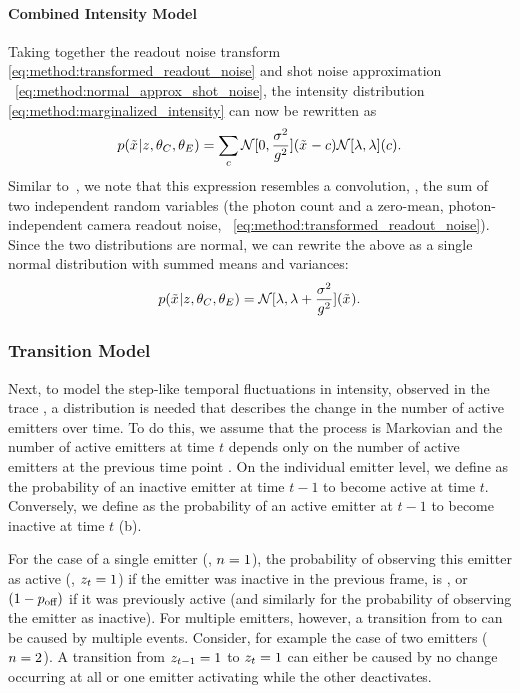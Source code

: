 \paragraph{Combined Intensity Model}

Taking together the readout noise transform
\eqref{eq:method:transformed_readout_noise} and shot noise approximation ~\eqref{eq:method:normal_approx_shot_noise}, the
intensity distribution \eqref{eq:method:marginalized_intensity} can now be
rewritten as
%
  \begin{equation}
    p(\tilde{x}_{}|z_{},\theta_C, \theta_E)
      = \sum_c
        \mathcal{N}[0, \frac{\sigma^2}{g^2}](\tilde{x}_{} - c)
        \mathcal{N}[\lambda, \lambda](c)
    \text{.}
  \end{equation}
  Similar to~\cite{huang_video-rate_2013}, we note that this expression
  resembles a convolution, \ie, the sum of two independent random variables
  (the photon count \photons and a zero-mean, photon-independent camera readout
  noise, ~\eqref{eq:method:transformed_readout_noise}). Since the two distributions are normal, we can rewrite
  the above as a single normal distribution with summed means and variances:
  \begin{equation}
    p(\tilde{x}_{}|z_{},\theta_C, \theta_E)
      = \mathcal{N}[\lambda, \lambda + \frac{\sigma^2}{g^2}](\tilde{x}_{})
    \text{.}
    \label{eq:method:combined_intensity}
  \end{equation}

\subsubsection{Transition Model}

Next, to model the step-like temporal fluctuations in intensity, observed in
the trace \trace, a distribution is needed that describes the change in the
number of active emitters \z{} over time.
  To do this, we assume that the process is Markovian and the number of active
  emitters  at time $t$ depends only on the number of active emitters at
  the previous time point .
  On the individual emitter level, we define \pon as the probability of an
  inactive emitter at time $t-1$ to become active at time $t$.
  Conversely, we define \poff as the probability of an active emitter at $t-1$
  to become inactive at time $t$ (b).

For the case of a single emitter (\ie, $n=1$), the probability of observing
this emitter as active (\ie, $z_{t}=1$) if the emitter was
inactive in the previous frame, is \pon , or $(1-p_\text{off})$ if 
it was previously active (and similarly for the probability of observing 
the emitter as inactive).
  For multiple emitters, however, a transition from  to  can be
  caused by multiple events. Consider, for example the case of two emitters
  ($n=2$). A transition from $z_{t-1}=1$ to $z_{t}=1$ can either be caused by
  no change occurring at all or one emitter activating while the other
  deactivates.

